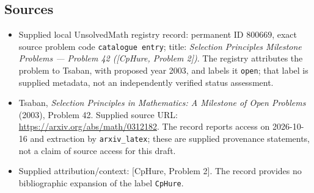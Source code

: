 \documentclass[11pt]{article}
\begin{document}
\subsection{Sources}
\begin{itemize}
\item Supplied local UnsolvedMath registry record: permanent ID \(800669\), exact source problem code \texttt{catalogue entry}; title: \emph{Selection Principles Milestone Problems --- Problem 42 ([CpHure, Problem 2])}. The registry attributes the problem to Tsaban, with proposed year 2003, and labels it \texttt{open}; that label is supplied metadata, not an independently verified status assessment.
\item Tsaban, \emph{Selection Principles in Mathematics: A Milestone of Open Problems} (2003), Problem 42. Supplied source URL: \url{https://arxiv.org/abs/math/0312182}. The record reports access on 2026-10-16 and extraction by \texttt{arxiv\_latex}; these are supplied provenance statements, not a claim of source access for this draft.
\item Supplied attribution/context: [CpHure, Problem 2]. The record provides no bibliographic expansion of the label \texttt{CpHure}.
\end{itemize}
\end{document}
